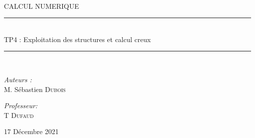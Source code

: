 \documentclass[12pt]{report}
\newcommand{\HRule}{\rule{\linewidth}{0.5mm}}
\begin{document}
\begin{titlepage}
  \begin{sffamily}
  \begin{center}


    \textsc{\Large  }\\[0.5cm]
    \textsc{\Large CALCUL NUMERIQUE}\\[1.3cm]

    \HRule \\[0.4cm]
    { \huge TP4 : Exploitation des structures et calcul creux \bfseries \\[0.4cm] }
    \HRule \\[1cm]

    \begin{minipage}{0.5\textwidth}
      \begin{flushleft} \large
        \emph{Auteurs : }\\

        M. Sébastien \textsc{Dubois}\\

      \end{flushleft}
    \end{minipage}
    \begin{minipage}{0.4\textwidth}
      \begin{flushright} \large
        \emph{Professeur: }\\
        T \textsc{Dufaud}

      \end{flushright}
    \end{minipage}

    \vfill
    \vspace{1cm}
    
    
    {\large 17 Décembre 2021}
    \end{center}
\end{sffamily}
\end{titlepage}
\end{document}
